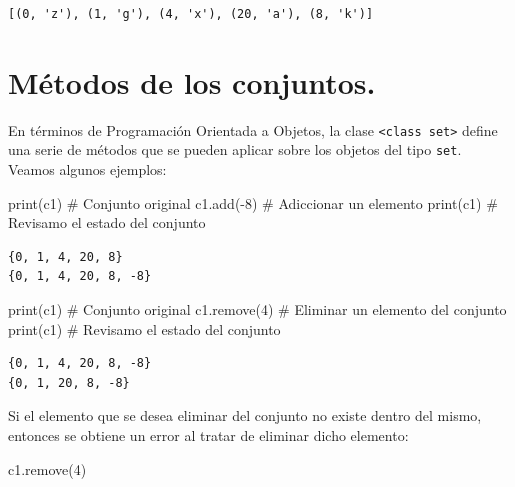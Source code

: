 \documentclass[
  spanish,
  letterpaper,
]{scrbook}
\newenvironment{Shaded}{\begin{snugshade}}{\end{snugshade}}
\newcommand{\BuiltInTok}[1]{\textcolor[rgb]{0.00,0.23,0.31}{#1}}
\newcommand{\CommentTok}[1]{\textcolor[rgb]{0.37,0.37,0.37}{#1}}
\newcommand{\DecValTok}[1]{\textcolor[rgb]{0.68,0.00,0.00}{#1}}
\newcommand{\NormalTok}[1]{\textcolor[rgb]{0.00,0.23,0.31}{#1}}
\newcommand{\OperatorTok}[1]{\textcolor[rgb]{0.37,0.37,0.37}{#1}}
\theoremstyle{definition}
\theoremstyle{remark}
\begin{document}
\begin{verbatim}
[(0, 'z'), (1, 'g'), (4, 'x'), (20, 'a'), (8, 'k')]
\end{verbatim}

\section{Métodos de los conjuntos.}\label{muxe9todos-de-los-conjuntos.}

En términos de Programación Orientada a Objetos, la clase
\texttt{\textless{}class\ \textquotesingle{}set\textquotesingle{}\textgreater{}}
define una serie de métodos que se pueden aplicar sobre los objetos del
tipo \texttt{set}. Veamos algunos ejemplos:

\begin{Shaded}
\begin{Highlighting}[]
\BuiltInTok{print}\NormalTok{(c1)  }\CommentTok{\# Conjunto original}
\NormalTok{c1.add(}\OperatorTok{{-}}\DecValTok{8}\NormalTok{) }\CommentTok{\# Adiccionar un elemento}
\BuiltInTok{print}\NormalTok{(c1)  }\CommentTok{\# Revisamo el estado del conjunto}
\end{Highlighting}
\end{Shaded}

\begin{verbatim}
{0, 1, 4, 20, 8}
{0, 1, 4, 20, 8, -8}
\end{verbatim}

\begin{Shaded}
\begin{Highlighting}[]
\BuiltInTok{print}\NormalTok{(c1)    }\CommentTok{\# Conjunto original}
\NormalTok{c1.remove(}\DecValTok{4}\NormalTok{) }\CommentTok{\# Eliminar un elemento del conjunto}
\BuiltInTok{print}\NormalTok{(c1)    }\CommentTok{\# Revisamo el estado del conjunto}
\end{Highlighting}
\end{Shaded}

\begin{verbatim}
{0, 1, 4, 20, 8, -8}
{0, 1, 20, 8, -8}
\end{verbatim}

Si el elemento que se desea eliminar del conjunto no existe dentro del
mismo, entonces se obtiene un error al tratar de eliminar dicho
elemento:

\begin{Shaded}
\begin{Highlighting}[]
\NormalTok{c1.remove(}\DecValTok{4}\NormalTok{)}
\end{Highlighting}
\end{Shaded}
\end{document}
